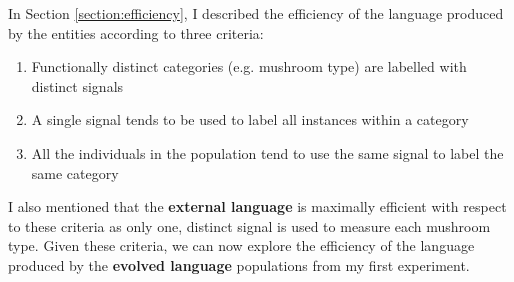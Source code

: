 \documentclass[12pt,a4paper,twoside,openright]{report}
\begin{document}
In Section \ref{section:efficiency}, I described the efficiency of the language produced by the entities according to three criteria:

\begin{enumerate}
	\item Functionally distinct categories (e.g. mushroom type) are labelled with distinct signals
	\item A single signal tends to be used to label all instances within a category
	\item All the individuals in the population tend to use the same signal to label the same category
\end{enumerate}

I also mentioned that the {\bf external language} is maximally efficient with respect to these criteria as only one, distinct signal is used to measure each mushroom type. Given these criteria, we can now explore the efficiency of the language produced by the {\bf evolved language} populations from my first experiment. 
\end{document}
